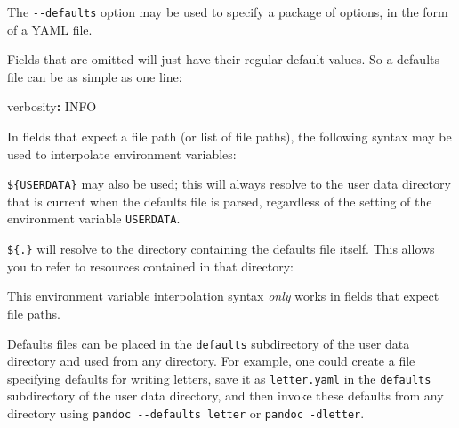 \documentclass[
]{article}
\newenvironment{Shaded}{}{}
\newcommand{\AttributeTok}[1]{\textcolor[rgb]{0.49,0.56,0.16}{#1}}
\newcommand{\CommentTok}[1]{\textcolor[rgb]{0.38,0.63,0.69}{\textit{#1}}}
\newcommand{\FunctionTok}[1]{\textcolor[rgb]{0.02,0.16,0.49}{#1}}
\newcommand{\KeywordTok}[1]{\textcolor[rgb]{0.00,0.44,0.13}{\textbf{#1}}}
\begin{document}
The \texttt{-\/-defaults} option may be used to specify a package of
options, in the form of a YAML file.

Fields that are omitted will just have their regular default values. So
a defaults file can be as simple as one line:

\begin{Shaded}
\begin{Highlighting}[]
\FunctionTok{verbosity}\KeywordTok{:}\AttributeTok{ INFO}
\end{Highlighting}
\end{Shaded}

In fields that expect a file path (or list of file paths), the following
syntax may be used to interpolate environment variables:

\begin{Shaded}
\end{Shaded}

\texttt{\$\{USERDATA\}} may also be used; this will always resolve to
the user data directory that is current when the defaults file is
parsed, regardless of the setting of the environment variable
\texttt{USERDATA}.

\texttt{\$\{.\}} will resolve to the directory containing the defaults
file itself. This allows you to refer to resources contained in that
directory:

\begin{Shaded}
\end{Shaded}

This environment variable interpolation syntax \emph{only} works in
fields that expect file paths.

Defaults files can be placed in the \texttt{defaults} subdirectory of
the user data directory and used from any directory. For example, one
could create a file specifying defaults for writing letters, save it as
\texttt{letter.yaml} in the \texttt{defaults} subdirectory of the user
data directory, and then invoke these defaults from any directory using
\texttt{pandoc\ -\/-defaults\ letter} or \texttt{pandoc\ -dletter}.
\end{document}
